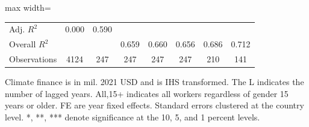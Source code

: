 \begin{table}[htbp]
\begin{adjustbox}{max width=\textwidth}
\begin{tabular}{l*{7}{c}}
Adj. $ R^2$         &       0.000   &       0.590   &               &               &               &               &               \\
Overall $ R^2$      &               &               &       0.659   &       0.660   &       0.656   &       0.686   &       0.712   \\
Observations        &        4124   &         247   &         247   &         247   &         247   &         210   &         141   \\
\bottomrule \end{tabular} \end{adjustbox} \begin{center} \begin{minipage}{0.85\textwidth} \footnotesize \flushleft Climate finance is in mil. 2021 USD and is IHS transformed. The L indicates the number of lagged years. All,15+ indicates all workers regardless of gender 15 years or older. FE are year fixed effects. Standard errors clustered at the country level. *, **, *** denote significance at the 10, 5, and 1 percent levels. \end{minipage} \end{center} \end{table}

